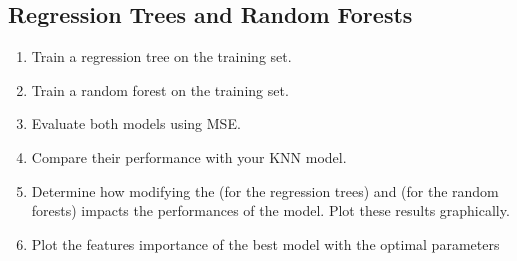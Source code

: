 \documentclass[letterpaper,10pt,english]{jupyterBook}
\begin{document}
\subsection{Regression Trees and Random Forests}
\label{\detokenize{03:regression-trees-and-random-forests}}\begin{enumerate}
%
\item {} 
\sphinxAtStartPar
Train a regression tree on the training set.

\item {} 
\sphinxAtStartPar
Train a random forest on the training set.

\item {} 
\sphinxAtStartPar
Evaluate both models using MSE.

\item {} 
\sphinxAtStartPar
Compare their performance with your KNN model.

\item {} 
\sphinxAtStartPar
Determine how modifying the  (for the regression trees) and  (for the random forests) impacts the performances of the model. Plot these results graphically.

\item {} 
\sphinxAtStartPar
Plot the features importance of the best model with the optimal parameters

\end{enumerate}
\end{document}
